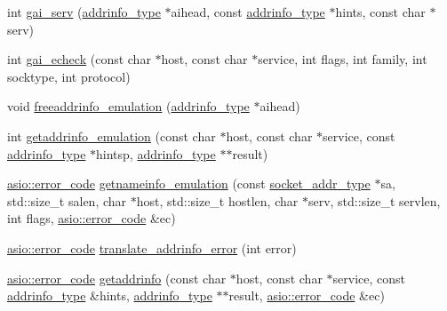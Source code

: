 \begin{DoxyCompactItemize}
\item 
int \hyperlink{namespaceasio_1_1detail_1_1socket__ops_ab8abd7ae55fffb703e61cb0ab5aabfd3}{gai\+\_\+serv} (\hyperlink{namespaceasio_1_1detail_ad8df56a17e3aa9ce2ad251fb76426e67}{addrinfo\+\_\+type} $\ast$aihead, const \hyperlink{namespaceasio_1_1detail_ad8df56a17e3aa9ce2ad251fb76426e67}{addrinfo\+\_\+type} $\ast$hints, const char $\ast$serv)
\item 
int \hyperlink{namespaceasio_1_1detail_1_1socket__ops_acbcfd09ff025b1cc00945ef4c61770c6}{gai\+\_\+echeck} (const char $\ast$host, const char $\ast$service, int flags, int family, int socktype, int protocol)
\item 
void \hyperlink{namespaceasio_1_1detail_1_1socket__ops_a2ae77ea5d1ef931d4a3fc60c455ca629}{freeaddrinfo\+\_\+emulation} (\hyperlink{namespaceasio_1_1detail_ad8df56a17e3aa9ce2ad251fb76426e67}{addrinfo\+\_\+type} $\ast$aihead)
\item 
int \hyperlink{namespaceasio_1_1detail_1_1socket__ops_a37ce1013248d51873bfe63fffd753494}{getaddrinfo\+\_\+emulation} (const char $\ast$host, const char $\ast$service, const \hyperlink{namespaceasio_1_1detail_ad8df56a17e3aa9ce2ad251fb76426e67}{addrinfo\+\_\+type} $\ast$hintsp, \hyperlink{namespaceasio_1_1detail_ad8df56a17e3aa9ce2ad251fb76426e67}{addrinfo\+\_\+type} $\ast$$\ast$result)
\item 
\hyperlink{classasio_1_1error__code}{asio\+::error\+\_\+code} \hyperlink{namespaceasio_1_1detail_1_1socket__ops_a6d40fe3b6bb610e7828fe81ab3f77183}{getnameinfo\+\_\+emulation} (const \hyperlink{namespaceasio_1_1detail_a40a7b0385a38f87815ffbb8df5e34d05}{socket\+\_\+addr\+\_\+type} $\ast$sa, std\+::size\+\_\+t salen, char $\ast$host, std\+::size\+\_\+t hostlen, char $\ast$serv, std\+::size\+\_\+t servlen, int flags, \hyperlink{classasio_1_1error__code}{asio\+::error\+\_\+code} \&ec)
\item 
\hyperlink{classasio_1_1error__code}{asio\+::error\+\_\+code} \hyperlink{namespaceasio_1_1detail_1_1socket__ops_aaf434e081cfea7b91f2c1da24879b5db}{translate\+\_\+addrinfo\+\_\+error} (int error)
\item 
\hyperlink{classasio_1_1error__code}{asio\+::error\+\_\+code} \hyperlink{namespaceasio_1_1detail_1_1socket__ops_aa4e7b340e0da1fafb23b035bf199a11d}{getaddrinfo} (const char $\ast$host, const char $\ast$service, const \hyperlink{namespaceasio_1_1detail_ad8df56a17e3aa9ce2ad251fb76426e67}{addrinfo\+\_\+type} \&hints, \hyperlink{namespaceasio_1_1detail_ad8df56a17e3aa9ce2ad251fb76426e67}{addrinfo\+\_\+type} $\ast$$\ast$result, \hyperlink{classasio_1_1error__code}{asio\+::error\+\_\+code} \&ec)

\end{DoxyCompactItemize}
